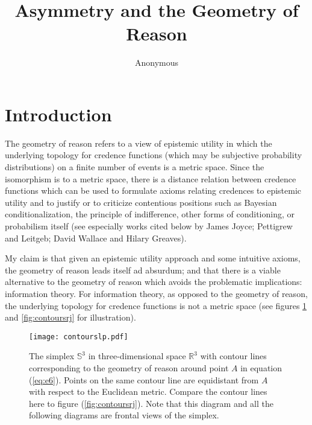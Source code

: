 \documentclass[11pt]{article}
\begin{document}
\title{Asymmetry and the Geometry of Reason}
\author{Anonymous}
\date{}
\maketitle

\section{Introduction}
\label{intr}

The geometry of reason refers to a view of epistemic utility in which
the underlying topology for credence functions (which may be
subjective probability distributions) on a finite number of events is
a metric space. Since the isomorphism is to a metric space, there is a
distance relation between credence functions which can be used to
formulate axioms relating credences to epistemic utility and to
justify or to criticize contentious positions such as Bayesian
conditionalization, the principle of indifference, other forms of
conditioning, or probabilism itself (see especially works cited below
by James Joyce; Pettigrew and Leitgeb; David Wallace and Hilary
Greaves).

My claim is that given an epistemic utility approach and some
intuitive axioms, the geometry of reason leads itself ad absurdum; and
that there is a viable alternative to the geometry of reason which
avoids the problematic implications: information theory. For
information theory, as opposed to the geometry of reason, the
underlying topology for credence functions is not a metric space (see
figures \ref{fig:contourslp} and \ref{fig:contoursrj} for
illustration).

\begin{figure}[ht]
  \begin{flushright}
    \begin{minipage}[h]{.7\linewidth}
      \texttt{[image: contourslp.pdf]}
      \caption{\footnotesize The simplex $\mathbb{S}^{3}$ in
        three-dimensional space $\mathbb{R}^{3}$ with contour lines
        corresponding to the geometry of reason around point $A$ in
        equation (\ref{eq:e6}). Points on the same contour line are
        equidistant from $A$ with respect to the Euclidean metric.
        Compare the contour lines here to figure
        (\ref{fig:contoursrj}). Note that this diagram and all the
        following diagrams are frontal views of the simplex.}
      \label{fig:contourslp}
    \end{minipage}
  \end{flushright}
\end{figure}
\end{document}
